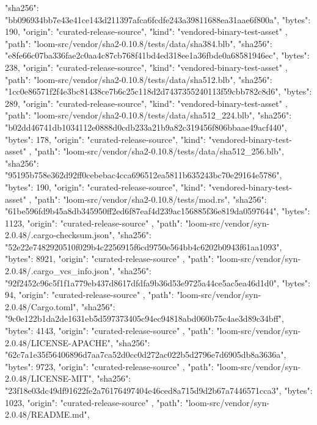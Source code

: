 {{      "sha256": "bb096934bb7e43e41ce143d211397afca6fcdfe243a39811688ea31aae6f800a",
      "bytes": 190,
      "origin": "curated-release-source",
      "kind": "vendored-binary-test-asset"
    },
    {
      "path": "loom-src/vendor/sha2-0.10.8/tests/data/sha384.blb",
      "sha256": "e8fe66c07ba336fae2c0aa4c87cb768f41bd4ed318ee1a36fbde0a68581946ec",
      "bytes": 238,
      "origin": "curated-release-source",
      "kind": "vendored-binary-test-asset"
    },
    {
      "path": "loom-src/vendor/sha2-0.10.8/tests/data/sha512.blb",
      "sha256": "1cc0e86571f2f4e3bc81438ce7b6c25c118d2d7437355240113f59cbb782c8d6",
      "bytes": 289,
      "origin": "curated-release-source",
      "kind": "vendored-binary-test-asset"
    },
    {
      "path": "loom-src/vendor/sha2-0.10.8/tests/data/sha512_224.blb",
      "sha256": "b02dd46741db1034112e0888d0cdb233a21b9a82c319456f806bbaae49acf440",
      "bytes": 178,
      "origin": "curated-release-source",
      "kind": "vendored-binary-test-asset"
    },
    {
      "path": "loom-src/vendor/sha2-0.10.8/tests/data/sha512_256.blb",
      "sha256": "95195b758e362d92ff0cebebac4cca696512ea5811b635243bc70e29164e5786",
      "bytes": 190,
      "origin": "curated-release-source",
      "kind": "vendored-binary-test-asset"
    },
    {
      "path": "loom-src/vendor/sha2-0.10.8/tests/mod.rs",
      "sha256": "61be596fd9b45a8db345950ff2ed6f87eaf4d239ac156885f36e819da0597644",
      "bytes": 1123,
      "origin": "curated-release-source"
    },
    {
      "path": "loom-src/vendor/syn-2.0.48/.cargo-checksum.json",
      "sha256": "52e22e7482920510f029b4c2256915f6cd9750e564bb4c6202b0943f61aa1093",
      "bytes": 8921,
      "origin": "curated-release-source"
    },
    {
      "path": "loom-src/vendor/syn-2.0.48/.cargo_vcs_info.json",
      "sha256": "92f2452c96c5f1f1a779eb437d8617dfdfa9b36d53e9725a44ce5ac5ea46d1d0",
      "bytes": 94,
      "origin": "curated-release-source"
    },
    {
      "path": "loom-src/vendor/syn-2.0.48/Cargo.toml",
      "sha256": "9c0e122b1da2de1631eb5d597373405c94ec94818abd060b75c4ae3d89c34bff",
      "bytes": 4143,
      "origin": "curated-release-source"
    },
    {
      "path": "loom-src/vendor/syn-2.0.48/LICENSE-APACHE",
      "sha256": "62c7a1e35f56406896d7aa7ca52d0cc0d272ac022b5d2796e7d6905db8a3636a",
      "bytes": 9723,
      "origin": "curated-release-source"
    },
    {
      "path": "loom-src/vendor/syn-2.0.48/LICENSE-MIT",
      "sha256": "23f18e03dc49df91622fe2a76176497404e46ced8a715d9d2b67a7446571cca3",
      "bytes": 1023,
      "origin": "curated-release-source"
    },
    {
      "path": "loom-src/vendor/syn-2.0.48/README.md",
}}
